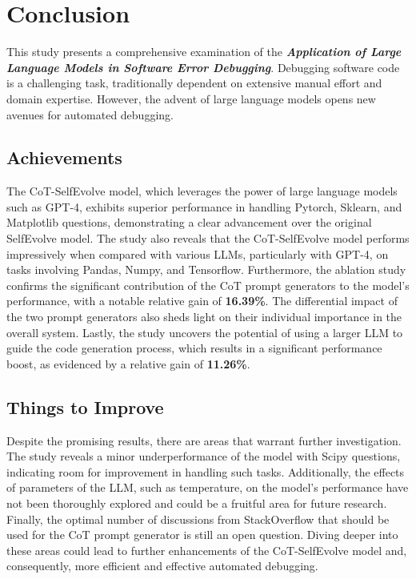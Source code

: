 \documentclass[a4paper,oneside]{book}
\begin{document}
\chapter{Conclusion}
This study presents a comprehensive examination of the \textbf{\textit{Application of Large Language Models in Software Error Debugging}}. Debugging software code is a challenging task, traditionally dependent on extensive manual effort and domain expertise. However, the advent of large language models opens new avenues for automated debugging.

\section{Achievements}
The CoT-SelfEvolve model, which leverages the power of large language models such as GPT-4, exhibits superior performance in handling Pytorch, Sklearn, and Matplotlib questions, demonstrating a clear advancement over the original SelfEvolve model. The study also reveals that the CoT-SelfEvolve model performs impressively when compared with various LLMs, particularly with GPT-4, on tasks involving Pandas, Numpy, and Tensorflow. Furthermore, the ablation study confirms the significant contribution of the CoT prompt generators to the model's performance, with a notable relative gain of \textbf{16.39\%}. The differential impact of the two prompt generators also sheds light on their individual importance in the overall system. Lastly, the study uncovers the potential of using a larger LLM to guide the code generation process, which results in a significant performance boost, as evidenced by a relative gain of \textbf{11.26\%}.

\section{Things to Improve}
Despite the promising results, there are areas that warrant further investigation. The study reveals a minor underperformance of the model with Scipy questions, indicating room for improvement in handling such tasks. Additionally, the effects of parameters of the LLM, such as temperature, on the model's performance have not been thoroughly explored and could be a fruitful area for future research. Finally, the optimal number of discussions from StackOverflow that should be used for the CoT prompt generator is still an open question. Diving deeper into these areas could lead to further enhancements of the CoT-SelfEvolve model and, consequently, more efficient and effective automated debugging.
\end{document}

